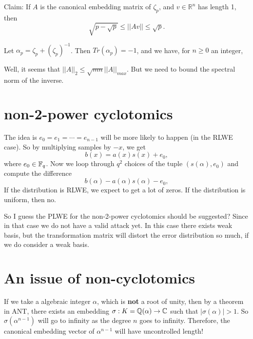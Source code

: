 \documentclass{amsart}
\begin{document}
Claim: If $A$ is the canonical embedding matrix of $\zeta_p$, and $v \in \mathbb{R}^n$ has length 1, then
\[
          \sqrt{p-\sqrt{p}}  \leq  ||Av|| \leq \sqrt{p}.
\]

Let $\alpha_p = \zeta_p + (\zeta_p)^{-1}$. Then $Tr(\alpha_p) = -1$, and we have, for $n \geq 0$ an integer,


\iffalse
\begin{Lemma}
$Tr(\alpha^n)$ =
\begin{cases} -2^{n-1} &\mbox{if } n \equiv 1 \pmod{2} \\
-2^{n-1} + (m+1/2) {n \choose n/2} &   \mbox{if } n \equiv 0 \pmod{2}
\end{cases}
\end{Lemma}
\fi

Well, it seems that $||A||_2 \leq \sqrt{mn} ||A||_{max}$. But we need to bound the spectral norm of the inverse.



\section{non-2-power cyclotomics}

The idea is $e_0 = e_1 = \cdots = e_{n-1}$ will be more likely to happen (in the RLWE case). So by multiplying
samples by $-x$, we get
\[
    b(x) = a(x)s(x) + e_0,
\]
where $e_0 \in \mathbb{F}_q$. Now we loop through $q^2$ choices of the tuple $(s(\alpha),e_0)$ and compute the difference
\[
    b(\alpha) - a(\alpha)s(\alpha) - e_0,
\]
If the distribution is RLWE, we expect to get a lot of zeros.
If the distribution is uniform, then no.

So I guess the PLWE for the non-2-power cyclotomics should be suggested? Since in that case we do not have a valid attack yet. In this case there exists weak basis, but the transformation matrix will distort the error distribution so much, if we do consider a weak basis.


\section{An issue of non-cyclotomics}

If we take a algebraic integer $\alpha$, which is {\bf not}
a root of unity, then by a theorem in ANT, there exists an embedding $\sigma: K = \mathbb{Q}(\alpha) \to \mathbb{C}$ such that $|\sigma(\alpha)| > 1$. So $\sigma(\alpha^{n-1})$ will go to infinity as the degree $n$ goes to infinity. Therefore, the canonical embedding vector of $\alpha^{n-1}$ will have uncontrolled length! \\
\end{document}
